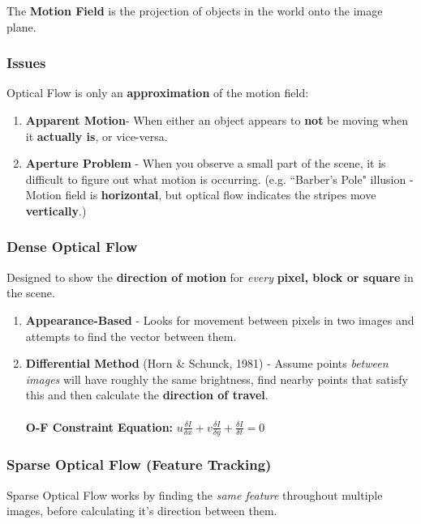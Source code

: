 \documentclass[english, 10pt]{article}
\begin{document}
 The \textbf{Motion Field} is the projection of objects in the world onto the image plane.

\subsubsection{Issues} 

Optical Flow is only an \textbf{approximation} of the motion field:

\begin{enumerate}
\item \textbf{Apparent Motion}- When either an object appears to \textbf{not} be moving when it \textbf{actually is}, or vice-versa.
\item \textbf{Aperture Problem} - When you observe a small part of the scene, it is difficult to figure out what motion is occurring. (e.g. ``Barber's Pole" illusion - Motion field is \textbf{horizontal}, but optical flow indicates the stripes move \textbf{vertically}.) 
\end{enumerate}

\subsubsection{Dense Optical Flow}

Designed to show the \textbf{direction of motion} for \textit{every} \textbf{pixel, block or square} in the scene.

\begin{enumerate}
\item \textbf{Appearance-Based } - Looks for movement between pixels in two images and attempts to find the vector between them. 
\item \textbf{Differential Method} (Horn \& Schunck, 1981) - Assume points \textit{between images} will have roughly the same brightness, find nearby points that satisfy this and then calculate the \textbf{direction of travel}. \\ \\ \textbf{O-F Constraint Equation:} $u\frac{\delta I}{\delta x} + v\frac{\delta I}{\delta y} + \frac{\delta I}{\delta t} = 0 $
\end{enumerate}

\subsubsection{Sparse Optical Flow (Feature Tracking)}

Sparse Optical Flow works by finding the \textit{same feature} throughout multiple images, before calculating it's direction between them. \\
\end{document}
